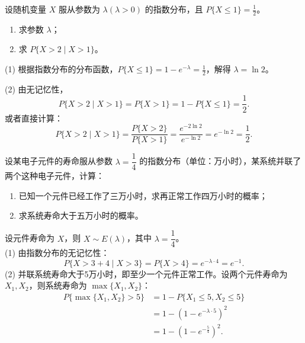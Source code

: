 \documentclass[lang=cn,11pt]{elegantbook}
\begin{document}
\begin{exercise}\label{exer:2-10}
设随机变量 $X$ 服从参数为 $\lambda(\lambda>0)$ 的指数分布，且 $P\{X \le 1\} = \frac{1}{2}$。
\begin{enumerate}
    \item[(1)] 求参数 $\lambda$；
    \item[(2)] 求 $P\{X > 2 \mid X > 1\}$。
\end{enumerate}
\end{exercise}
\begin{solution}
(1) 根据指数分布的分布函数，$P\{X \le 1\} = 1 - e^{-\lambda} = \frac{1}{2}$，解得 $\lambda = \ln 2$。

(2) 由无记忆性，
\[
P\{X > 2 \mid X > 1\} = P\{X > 1\} = 1 - P\{X \le 1\} = \frac{1}{2}.
\]
或者直接计算：
\[
P\{X > 2 \mid X > 1\} = \frac{P\{X > 2\}}{P\{X > 1\}} = \frac{e^{-2\ln 2}}{e^{-\ln 2}} = e^{-\ln 2} = \frac{1}{2}.
\]
\end{solution}

\begin{exercise}[（指数分布无记忆性应用）]
设某电子元件的寿命服从参数 $\lambda=\dfrac{1}{4}$ 的指数分布（单位：万小时），某系统并联了两个这种电子元件，计算：
\begin{enumerate}
    \item[(1)] 已知一个元件已经工作了三万小时，求再正常工作四万小时的概率；
    \item[(2)] 求系统寿命大于五万小时的概率。
\end{enumerate}
\end{exercise}
\begin{solution}
设元件寿命为 $X$，则 $X\sim E(\lambda)$，其中 $\lambda=\dfrac{1}{4}$。\\
(1) 由指数分布的无记忆性：
\[
P\{X>3+4 \mid X>3\} = P\{X>4\} = e^{-\lambda\cdot4} = e^{-1}.
\]
(2) 并联系统寿命大于5万小时，即至少一个元件正常工作。设两个元件寿命为 $X_1, X_2$，则系统寿命为 $\max\{X_1,X_2\}$：
\[
\begin{aligned}
P\{\max\{X_1,X_2\}>5\} &= 1-P\{X_1\leqslant5, X_2\leqslant5\} \\
&= 1-\left(1-e^{-\lambda\cdot5}\right)^2 \\
&= 1-\left(1-e^{-\frac{5}{4}}\right)^2.
\end{aligned}
\]
\end{solution}
\end{document}
